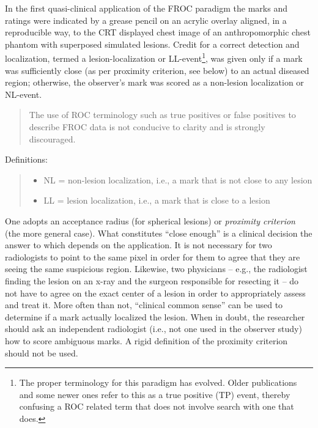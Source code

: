 \documentclass[
]{book}
\providecommand{\tightlist}{%
  \setlength{\itemsep}{0pt}\setlength{\parskip}{0pt}}
\begin{document}
In the first quasi-clinical application of the FROC paradigm \citep{Chakraborty1986DigitalVsConv} the marks and ratings were indicated by a grease pencil on an acrylic overlay aligned, in a reproducible way, to the CRT displayed chest image of an anthropomorphic chest phantom with superposed simulated lesions. Credit for a correct detection and localization, termed a lesion-localization or LL-event\footnote{The proper terminology for this paradigm has evolved. Older publications and some newer ones refer to this as a true positive (TP) event, thereby confusing a ROC related term that does not involve search with one that does.}, was given only if a mark was sufficiently close (as per proximity criterion, see below) to an actual diseased region; otherwise, the observer's mark was scored as a non-lesion localization or NL-event.

\begin{quote}
The use of ROC terminology such as true positives or false positives to describe FROC data is not conducive to clarity and is strongly discouraged.
\end{quote}

Definitions:

\begin{quote}
\begin{itemize}
\tightlist
\item
  NL = non-lesion localization, i.e., a mark that is not close to any lesion
\item
  LL = lesion localization, i.e., a mark that is close to a lesion
\end{itemize}
\end{quote}

One adopts an acceptance radius (for spherical lesions) or \emph{proximity criterion} (the more general case). What constitutes ``close enough'' is a clinical decision the answer to which depends on the application. It is not necessary for two radiologists to point to the same pixel in order for them to agree that they are seeing the same suspicious region. Likewise, two physicians -- e.g., the radiologist finding the lesion on an x-ray and the surgeon responsible for resecting it -- do not have to agree on the exact center of a lesion in order to appropriately assess and treat it. More often than not, ``clinical common sense'' can be used to determine if a mark actually localized the lesion. When in doubt, the researcher should ask an independent radiologist (i.e., not one used in the observer study) how to score ambiguous marks. A rigid definition of the proximity criterion should not be used.
\end{document}
